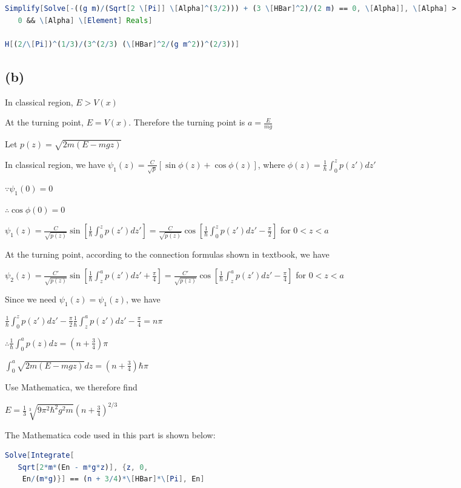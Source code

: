 \documentclass[12pt]{article}
\begin{document}
\begin{spacing}{2.0}
\begin{lstlisting}[language=Mathematica,breaklines=true,frame=single]
Simplify[Solve[-((g m)/(Sqrt[2 \[Pi]] \[Alpha]^(3/2))) + (3 \[HBar]^2)/(2 m) == 0, \[Alpha]], \[Alpha] >
   0 && \[Alpha] \[Element] Reals]

H[(2/\[Pi])^(1/3)/(3^(2/3) (\[HBar]^2/(g m^2))^(2/3))]
\end{lstlisting}

\subsection*{(b)}

In classical region, $E > V(x)$

At the turning point, $E=V(x)$. Therefore the turning point is $a=\frac{E}{mg}$

Let $p(z)= \sqrt{2m(E-mgz)}$

In classical region, we have $\psi_1(z)= \frac{C}{\sqrt{p}} \left[ \sin \phi(z) + \cos \phi(z) \right]$, where $\phi(z)= \frac{1}{\hbar} \int_{0}^{z} p(z') dz' $

$\because \psi_1(0)=0$

$\therefore \cos \phi(0)=0$

$\psi_1(z)= \frac{C}{\sqrt{p(z)}} \sin \left[\frac{1}{\hbar} \int_{0}^{z} p(z') dz' \right]= \frac{C}{\sqrt{p(z)}} \cos \left[\frac{1}{\hbar} \int_{0}^{z} p(z') dz' - \frac{\pi}{2} \right]$ for $0<z<a$

At the turning point, according to the connection formulas shown in textbook, we have

$\psi_2(z) = \frac{C'}{\sqrt{p(z)}} \sin \left[ \frac{1}{\hbar} \int_z^a p(z') dz' + \frac{\pi}{4} \right]= \frac{C'}{\sqrt{p(z)}} \cos \left[ \frac{1}{\hbar} \int_z^a p(z') dz' - \frac{\pi}{4} \right]$ for $0<z<a$

Since we need $\psi_1(z)=\psi_1(z)$, we have

$\frac{1}{\hbar} \int_{0}^{z} p(z') dz' - \frac{\pi}{2} \frac{1}{\hbar} \int_z^a p(z') dz' - \frac{\pi}{4} = n\pi$

$\therefore \frac{1}{\hbar} \int_{0}^{a} p(z) dz= (n+ \frac{3}{4})\pi$

$\int_{0}^{a} \sqrt{2m(E-mgz)} dz= (n+ \frac{3}{4})\hbar \pi$

Use Mathematica, we therefore find

$E=\frac{1}{3} \sqrt[3]{9\pi^2 \hbar^2 g^2 m} \left( n+\frac{3}{4} \right)^{2/3}$

The Mathematica code used in this part is shown below:

\begin{lstlisting}[language=Mathematica,breaklines=true,frame=single]
Solve[Integrate[
   Sqrt[2*m*(En - m*g*z)], {z, 0,
    En/(m*g)}] == (n + 3/4)*\[HBar]*\[Pi], En]
\end{lstlisting}


\end{spacing}
\end{document}
